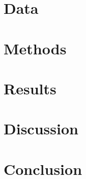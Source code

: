 \documentclass{ametsocV5}
\begin{document}
\section{Data}

\section{Methods}

\section{Results}

\section{Discussion}

\section{Conclusion}

%
%
%


%

\end{document}
